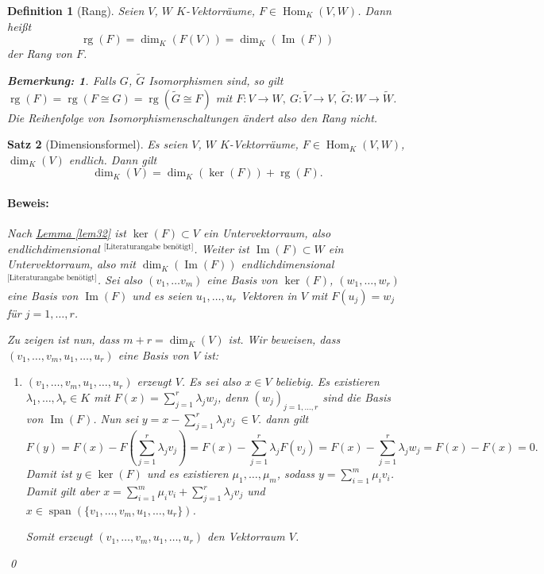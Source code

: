 \documentclass{report}
\newcommand{\IN}[1]{\index{#1|BH}}
\newcommand{\lb}{\lambda}
\DeclareMathOperator{\Span}{span}
\DeclareMathOperator{\Hom}{Hom}
\DeclareMathOperator{\Ima}{Im}
\DeclareMathOperator{\rg}{rg}
\theoremstyle{customrem}
\newtheorem*{bemerkung}{Bemerkung\textnormal:}
\theoremstyle{customdef}
\newtheorem{definition}{Definition}[chapter]
\newtheorem{satz}[definition]{Satz}
\renewenvironment{proof}{\paragraph{Beweis: }}{\qed}
\begin{document}
	\begin{definition}[Rang]
		\IN{Rang}
		Seien $V$, $W$ $K$-Vektorräume, $F\in\Hom_K(V, W)$. Dann heißt $$\rg(F)=\dim_K(F(V)) = \dim_K(\Ima(F))$$ der \textsl{Rang} von $F$.\\
		\begin{bemerkung}
			Falls $G$, $\widetilde{G}$ Isomorphismen sind, so gilt $\rg(F) = \rg(F\cong G) = \rg(\widetilde{G}\cong F)$ mit $F:V\to W,\ G:\widetilde{V}\to V,\ \widetilde{G}: W\to\widetilde{W}$. Die Reihenfolge von Isomorphismenschaltungen ändert also den Rang nicht.\\
		\end{bemerkung}
	\end{definition}
	
	\begin{satz}[Dimensionsformel]
		\IN{Dimensionsformel}
		\label{satz37}
		Es seien $V$, $W$ $K$-Vektorräume, $F\in\Hom_K(V, W)$, $\dim_K(V)$ endlich. Dann gilt $$\dim_K(V) = \dim_K(\ker(F))+\rg(F).$$
		\begin{proof}
			Nach \hyperref[lem32]{Lemma \ref*{lem32}} ist $\ker(F)\subset V$ ein Untervektorraum, also endlichdimensional ${}^\text{[Literaturangabe benötigt]}$. Weiter ist $\Ima(F)\subset W$ ein Untervektorraum, also mit $\dim_K(\Ima(F))$ endlichdimensional ${}^\text{[Literaturangabe benötigt]}$. Sei also $(v_1, \ldots v_m)$ eine Basis von $\ker(F)$, $(w_1,\ldots, w_r)$ eine Basis von $\Ima(F)$ und es seien $u_1,\ldots, u_r$ Vektoren in $V$ mit $F(u_j)=w_j$ für $j=1, \ldots, r$.
			
			Zu zeigen ist nun, dass $m+r=\dim_K(V)$ ist. Wir beweisen, dass $(v_1, \ldots, v_m, u_1, \ldots, u_r)$ eine Basis von $V$ ist:
			\begin{enumerate}
				\item $(v_1, \ldots, v_m, u_1, \ldots, u_r)$ erzeugt $V$. Es sei also $x\in V$ beliebig. Es existieren $\lb_1, \ldots, \lb_r\in K$ mit $F(x) = \sum_{j=1}^{r}\lb_j w_j$, denn $(w_j)_{j=1, \ldots, r}$ sind die Basis von $\Ima(F)$. Nun sei $y=x-\sum_{j=1}^{r}\lb_j v_j\ \in V$. dann gilt $$F(y) = F(x) - F\left(\sum_{j=1}^{r}\lb_j v_j\right) = F(x) - \sum_{j=1}^{r}\lb_j F(v_j)= F(x) - \sum_{j=1}^{r}\lb_j w_j = F(x)-F(x)=0.$$ Damit ist $y\in \ker(F)$ und es existieren $\mu_1, \ldots, \mu_m$, sodass $y=\sum_{i=1}^{m}\mu_i v_i$. Damit gilt aber $x=\sum_{i=1}^{m}\mu_iv_i + \sum_{j=1}^{r}\lb_jv_j$ und $x\in \Span(\{v_1, \ldots, v_m, u_1, \ldots, u_r\})$. 
				
				Somit erzeugt $(v_1, \ldots, v_m, u_1, \ldots, u_r)$ den Vektorraum $V$.
				

\end{enumerate}
\end{proof}
\end{satz}
\end{document}
